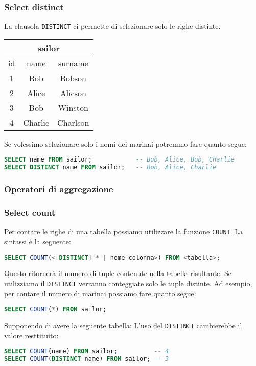 \subsubsection{Select distinct}
La clausola \texttt{DISTINCT} ci permette di selezionare solo le righe distinte.
\begin{center}
	\begin{tabular}{|c | c c|}
		\multicolumn{3}{c}{sailor} \\
		\hline
		id & name    & surname     \\
		\hline
		\hline
		1  & Bob     & Bobson      \\
		2  & Alice   & Alicson     \\
		3  & Bob     & Winston     \\
		4  & Charlie & Charlson    \\
		\hline
	\end{tabular}
\end{center}
Se volessimo selezionare solo i nomi dei marinai potremmo fare quanto segue:
\begin{lstlisting}[language = SQL, style = SQL, frame = none] 
SELECT name FROM sailor;            -- Bob, Alice, Bob, Charlie
SELECT DISTINCT name FROM sailor;   -- Bob, Alice, Charlie
\end{lstlisting}

\subsubsection{Operatori di aggregazione}
\subsubsection*{Select count}\label{select count}
Per contare le righe di una tabella possiamo utilizzare la funzione \texttt{COUNT}. La sintassi è la seguente:
\begin{lstlisting}[language = SQL, style = SQL, frame = none]
SELECT COUNT(<[DISTINCT] * | nome colonna>) FROM <tabella>;
\end{lstlisting}
Questo ritornerà il numero di tuple contenute nella tabella risultante. Se utilizziamo il \verb|DISTINCT| verranno conteggiate solo le tuple distinte. Ad esempio, per contare il numero di marinai possiamo fare quanto segue:
\begin{lstlisting}[language = SQL, style = SQL, frame = none]
SELECT COUNT(*) FROM sailor;
\end{lstlisting}

Supponendo di avere la seguente tabella:
L'uso del \verb|DISTINCT| cambierebbe il valore resttituito:
\begin{lstlisting}[language = SQL, style = SQL, frame = none]
SELECT COUNT(name) FROM sailor;          -- 4
SELECT COUNT(DISTINCT name) FROM sailor; -- 3
\end{lstlisting}

